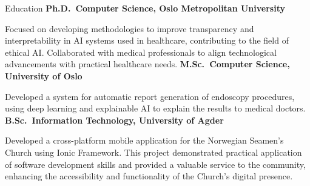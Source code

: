 \begin{rubric}{Education}
\entry*[2018 -- 2022]%
\textbf{Ph.D.~Computer Science, Oslo Metropolitan University} \par
Focused on developing methodologies to improve transparency and interpretability in AI systems used in healthcare, contributing to the field of ethical AI.
Collaborated with medical professionals to align technological advancements with practical healthcare needs.
%
\entry*[2016 -- 2018]%
\textbf{M.Sc.~Computer Science, University of Oslo} \par
Developed a system for automatic report generation of endoscopy procedures, using deep learning and explainable AI to explain the results to medical doctors.
% 
\entry*[2012 -- 2015]%
\textbf{B.Sc.~Information Technology, University of Agder} \par
Developed a cross-platform mobile application for the Norwegian Seamen's Church using Ionic Framework. This project demonstrated practical application of software development skills and provided a valuable service to the community, enhancing the accessibility and functionality of the Church's digital presence.
\end{rubric}